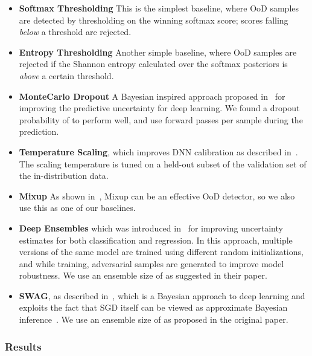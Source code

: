 \documentclass[accepted]{uai2021} \pdfoutput=1
\begin{document}
\begin{itemize}
	\item \textbf{Softmax Thresholding} This is the simplest baseline, where OoD samples are detected by thresholding on the winning softmax score; scores falling \textit{below} a threshold are rejected. 


	\item \textbf{Entropy Thresholding} Another simple baseline, where OoD samples are rejected if the Shannon entropy calculated over the softmax posteriors is \textit{above} a certain threshold.
	
	\item \textbf{MonteCarlo Dropout} A Bayesian inspired approach proposed in~\cite{gal2016dropout} for improving the predictive uncertainty for deep learning. 
We found a dropout probability of  to perform well, and use  forward passes per sample during the prediction. 

	\item \textbf{Temperature Scaling}, which improves DNN calibration as described in~\cite{guo2017calibration}. The scaling temperature  is tuned on a held-out subset of the validation set of the in-distribution data.
	
	\item \textbf{Mixup} As shown in~\cite{thulasidasan2019mixup}, Mixup can be an effective OoD detector, so we also use this as one of our baselines.
	
	\item \textbf{Deep Ensembles} which was introduced in~\cite{lakshminarayanan2017simple} for improving uncertainty estimates for both classification and regression. In this approach, multiple versions of the same model are trained using different random initializations, and while training, adversarial samples are generated to improve model robustness.
We use an ensemble size of  as suggested in their paper.
	
	\item \textbf{SWAG}, as described in~\cite{maddox2019simple}, which is a Bayesian approach to deep learning and exploits the fact that SGD itself can be viewed as approximate Bayesian inference~\cite{mandt2017stochastic}. 
We use an ensemble size of  as proposed in the original paper.
	
\end{itemize}






\subsubsection{Results}
\end{document}
